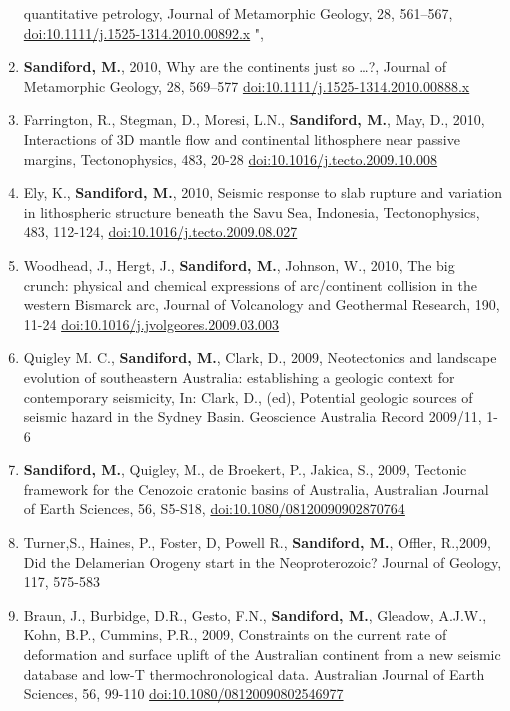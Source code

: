 \documentclass[
]{article}
\begin{document}
\begin{enumerate}
  quantitative petrology, Journal of Metamorphic Geology, 28, 561--567,
  \url{doi:10.1111/j.1525-1314.2010.00892.x} ",
\item
  \textbf{Sandiford, M.}, 2010, Why are the continents just so \ldots?,
  Journal of Metamorphic Geology, 28, 569--577
  \url{doi:10.1111/j.1525-1314.2010.00888.x} 
\item
  Farrington, R., Stegman, D., Moresi, L.N., \textbf{Sandiford, M.},
  May, D., 2010, Interactions of 3D mantle flow and continental
  lithosphere near passive margins, Tectonophysics, 483, 20-28
  \url{doi:10.1016/j.tecto.2009.10.008} 
\item
  Ely, K., \textbf{Sandiford, M.}, 2010, Seismic response to slab
  rupture and variation in lithospheric structure beneath the Savu Sea,
  Indonesia, Tectonophysics, 483, 112-124,
  \url{doi:10.1016/j.tecto.2009.08.027} 
\item
  Woodhead, J., Hergt, J., \textbf{Sandiford, M.}, Johnson, W., 2010,
  The big crunch: physical and chemical expressions of arc/continent
  collision in the western Bismarck arc, Journal of Volcanology and
  Geothermal Research, 190, 11-24
  \url{doi:10.1016/j.jvolgeores.2009.03.003} 
\item
  Quigley M. C., \textbf{Sandiford, M.}, Clark, D., 2009, Neotectonics
  and landscape evolution of southeastern Australia: establishing a
  geologic context for contemporary seismicity, In: Clark, D., (ed),
  Potential geologic sources of seismic hazard in the Sydney Basin.
  Geoscience Australia Record 2009/11, 1-6
\item
  \textbf{Sandiford, M.}, Quigley, M., de Broekert, P., Jakica, S.,
  2009, Tectonic framework for the Cenozoic cratonic basins of
  Australia, Australian Journal of Earth Sciences, 56, S5-S18,
  \url{doi:10.1080/08120090902870764} 
\item
  Turner,S., Haines, P., Foster, D, Powell R., \textbf{Sandiford, M.},
  Offler, R.,2009, Did the Delamerian Orogeny start in the
  Neoproterozoic? Journal of Geology, 117, 575-583
\item
  Braun, J., Burbidge, D.R., Gesto, F.N., \textbf{Sandiford, M.},
  Gleadow, A.J.W., Kohn, B.P., Cummins, P.R., 2009, Constraints on the
  current rate of deformation and surface uplift of the Australian
  continent from a new seismic database and low-T thermochronological
  data. Australian Journal of Earth Sciences, 56, 99-110
  \url{doi:10.1080/08120090802546977} 

\end{enumerate}
\end{document}
